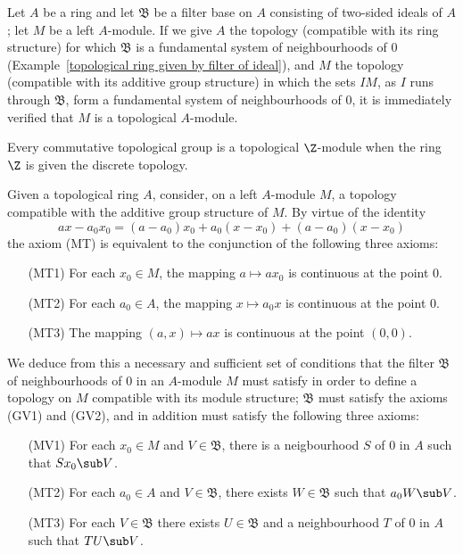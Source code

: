 \begin{example}
Let $A$ be a ring and let $\mathfrak{B}$ be a filter base on $A$ consisting of two-sided ideals of $A$; let $M$ be a left $A$-module. If we give $A$ the topology (compatible with its ring structure) for which $\mathfrak{B}$ is a fundamental system of neighbourhoods of $0$ (Example~\ref{topological ring given by filter of ideal}), and $M$ the topology (compatible with its additive group structure) in which the sets $IM$, as $I$ runs through $\mathfrak{B}$, form a fundamental system of neighbourhoods of $0$, it is immediately verified that $M$ is a topological $A$-module.
\end{example}
\begin{example}
Every commutative topological group is a topological $\Z$-module when the ring $\Z$ is given the discrete topology.
\end{example}
Given a topological ring $A$, consider, on a left $A$-module $M$, a topology compatible with the additive group structure of $M$. By virtue of the identity
\[ax-a_0x_0=(a-a_0)x_0+a_0(x-x_0)+(a-a_0)(x-x_0)\]
the axiom (MT) is equivalent to the conjunction of the following three axioms:
\begin{enumerate}[leftmargin=40pt]
\item[(MT1)] For each $x_0\in M$, the mapping $a\mapsto ax_0$ is continuous at the point $0$.
\item[(MT2)] For each $a_0\in A$, the mapping $x\mapsto a_0x$ is continuous at the point $0$.
\item[(MT3)] The mapping $(a,x)\mapsto ax$ is continuous at the point $(0,0)$.
\end{enumerate}
We deduce from this a necessary and sufficient set of conditions that the filter $\mathfrak{B}$ of neighbourhoods of $0$ in an $A$-module $M$ must satisfy in order to define a topology on $M$ compatible with its module structure; $\mathfrak{B}$ must satisfy the axioms (GV1) and (GV2), and in addition must satisfy the following three axioms:
\begin{enumerate}[leftmargin=40pt]
\item[(MV1)] For each $x_0\in M$ and $V\in\mathfrak{B}$, there is a neigbourhood $S$ of $0$ in $A$ such that $Sx_0\sub V$.
\item[(MT2)] For each $a_0\in A$ and $V\in\mathfrak{B}$, there exists $W\in\mathfrak{B}$ such that $a_0W\sub V$.
\item[(MT3)] For each $V\in\mathfrak{B}$ there exists $U\in\mathfrak{B}$ and a neighbourhood $T$ of $0$ in $A$ such that $TU\sub V$.
\end{enumerate}

